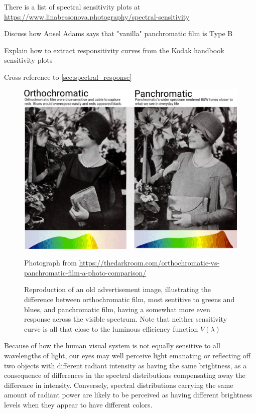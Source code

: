 \begin{inconstruction}
	There is a list of spectral sensitivity plots at 
	\url{https://www.linabessonova.photography/spectral-sensitivity}
	
	Discuss how Ansel Adams says that "vanilla" panchromatic film is Type B
	
	Explain how to extract responsitivity curves from the Kodak handbook sensitivity 
	plots
	
	Cross reference to \cref{sec:spectral_response}
\end{inconstruction}

\begin{figure}
	{
		\hfill
		\includegraphics[width=.8\linewidth]{figures_built/Orthochromatic-Panchromatic-film-1024x768-1.jpg}
		\hfill
	}	
	
	\caption{\label{fig:orthopanphoto}
		Reproduction of an old advertisement image, illustrating the difference between
		orthochromatic film, most sentitive to greens and blues, and panchromatic film,
		having a somewhat more even response across the visible spectrum. 
		Note that neither sensitivity curve is all that close to the luminous efficiency
		function $V(\lambda)$}
	{\scriptsize\hfill
		Photograph from \url{https://thedarkroom.com/orthochromatic-vs-panchromatic-film-a-photo-comparison/}
	}
\end{figure}

Because of how the human visual system is not equally sensitive to all wavelengths
of light, our eyes may well perceive light emanating or reflecting 
off two objects with different radiant intensity as having the same brightness, 
as a consequence of differences in the spectral distributions compensating 
away the difference in intensity. 
Conversely, \glspl{spectral distribution} carrying the same amount
of radiant power are likely to be perceived as having different brightness levels 
when they appear to have different colors.

